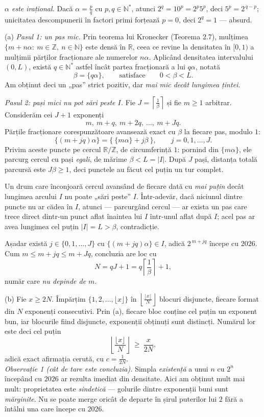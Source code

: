 \emph{$\alpha$ este irațional.} Dacă $\alpha=\frac pq$ cu $p,q\in\mathbb{N}^{*}$, atunci $2^{q}=10^{p}=2^{p}5^{p}$, deci $5^{p}=2^{\,q-p}$; unicitatea descompunerii în factori primi forțează $p=0$, deci $2^{q}=1$ --- absurd.

(a) \emph{Pasul 1: un pas mic.} Prin teorema lui Kronecker (Teorema 2.7), mulțimea $\{m+n\alpha:\ m\in\mathbb{Z},\ n\in\mathbb{N}\}$ este densă în $\mathbb{R}$, ceea ce revine la densitatea în $[0,1)$ a mulțimii părților fracționare ale numerelor $n\alpha$. Aplicând densitatea intervalului $(0,L)$, există $q\in\mathbb{N}^{*}$ astfel încât partea fracționară a lui $q\alpha$, notată
\[ \beta=\{q\alpha\}, \qquad\text{satisface}\qquad 0<\beta<L . \]
Am obținut deci un „pas'' strict pozitiv, dar \emph{mai mic decât lungimea țintei}.

\emph{Pasul 2: pași mici nu pot sări peste $I$.} Fie $J=\left\lceil\frac1\beta\right\rceil$ și fie $m\ge1$ arbitrar. Considerăm cei $J+1$ exponenți
\[ m,\ m+q,\ m+2q,\ \dots,\ m+Jq . \]
Părțile fracționare corespunzătoare avansează exact cu $\beta$ la fiecare pas, modulo $1$:
\[ \{(m+jq)\alpha\}=\bigl\{\ \{m\alpha\}+j\beta\ \bigr\},\qquad j=0,1,\dots,J . \]
Privim aceste puncte pe cercul $\mathbb{R}/\mathbb{Z}$, de circumferință $1$: pornind din $\{m\alpha\}$, ele parcurg cercul cu pași \emph{egali}, de mărime $\beta<L=|I|$. După $J$ pași, distanța totală parcursă este $J\beta\ge1$, deci punctele au făcut cel puțin un tur complet.

Un drum care înconjoară cercul avansând de fiecare dată cu \emph{mai puțin} decât lungimea arcului $I$ nu poate „sări peste'' $I$. Într-adevăr, dacă niciunul dintre puncte nu ar cădea în $I$, atunci --- parcurgând cercul --- ar exista un pas care trece direct dintr-un punct aflat înaintea lui $I$ într-unul aflat după $I$; acel pas ar avea lungimea cel puțin $|I|=L>\beta$, contradicție.

Așadar există $j\in\{0,1,\dots,J\}$ cu $\{(m+jq)\alpha\}\in I$, adică $2^{\,m+jq}$ începe cu $2026$. Cum $m\le m+jq\le m+Jq$, concluzia are loc cu
\[ N=qJ+1=q\left\lceil\frac1\beta\right\rceil+1 , \]
număr care \emph{nu depinde de $m$}.

(b) Fie $x\ge2N$. Împărțim $\{1,2,\dots,\lfloor x\rfloor\}$ în $\left\lfloor\frac{\lfloor x\rfloor}{N}\right\rfloor$ blocuri disjuncte, fiecare format din $N$ exponenți consecutivi. Prin (a), fiecare bloc conține cel puțin un exponent bun, iar blocurile fiind disjuncte, exponenții obținuți sunt distincți. Numărul lor este deci cel puțin
\[ \left\lfloor\frac{\lfloor x\rfloor}{N}\right\rfloor\ \ge\ \frac{x}{2N} , \]
adică exact afirmația cerută, cu $c=\frac1{2N}$.\\[2pt]
\emph{Observație 1 (cât de tare este concluzia).} Simpla \emph{existență} a unui $n$ cu $2^{n}$ începând cu $2026$ ar rezulta imediat din densitate. Aici am obținut mult mai mult: proprietatea este \emph{sindetică} --- golurile dintre exponenții buni sunt \emph{mărginite}. Nu se poate merge oricât de departe în șirul puterilor lui $2$ fără a întâlni una care începe cu $2026$.

